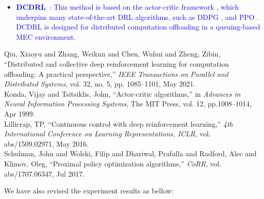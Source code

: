 \documentclass[12pt,draftclsnofoot,onecolumn]{IEEEtran}
\newcommand{\rev}[1]{{\color{blue}#1}} %
\newcommand{\rev}[1]{#1}
\newenvironment{my}[2]%
{\begin{list}{}%
{\setlength{\rightmargin}{#1}\setlength{\leftmargin}{#2}}%


 \item[]{}

} {\end{list}}
\begin{document}
\begin{enumerate}
\begin{my}{1cm}{1cm}
{{\begin{itemize}
	\color{blue}
	\item \textcolor{blue}{\textbf{DCDRL}~\cite{qiu2020distributed}: This method is based on the actor-critic framework \cite{NIPS1999_6449f44a}, which underpins many state-of-the-art DRL algorithms, such as DDPG \cite{lillicrap2015continuous}, and PPO \cite{schulman2017proximal}. DCDRL is designed for distributed computation offloading in a queuing-based MEC environment.}
	
	
	
\end{itemize}

}}
\end{my}\vspace{5mm}

	\begin{my}{1cm}{1cm}
	\rev{
		{\small
			\noindent\hspace{-0.5mm}\cite{qiu2020distributed} Qiu, Xiaoyu and Zhang, Weikun and Chen, Wuhui and Zheng, Zibin, ``Distributed and collective deep reinforcement learning for computation offloading: A practical perspective,'' \textit{IEEE Transactions on Parallel and Distributed Systems}, vol. 32, no. 5, pp. 1085--1101, May 2021.\\[10pt]
			\cite{NIPS1999_6449f44a} Konda, Vijay and Tsitsiklis, John, ``Actor-critic algorithms,'' in \textit{Advances in Neural Information Processing Systems}, The {MIT} Press, vol. 12, pp.1008--1014, Apr 1999.\\[10pt]
			\cite{lillicrap2015continuous} Lillicrap, TP, ``Continuous control with deep reinforcement learning,'' \textit{4th International Conference on Learning Representations, {ICLR}}, vol. abs/1509.02971, May 2016.\\[10pt]
			\cite{schulman2017proximal} Schulman, John and Wolski, Filip and Dhariwal, Prafulla and Radford, Alec and Klimov, Oleg, ``Proximal policy optimization algorithms,'' \textit{CoRR}, vol. abs/1707.06347, Jul 2017.}\\}
\end{my}




We have also revised the experiment results as bellow: 

\setcounter{figure}{2}


\end{enumerate}
\end{document}
